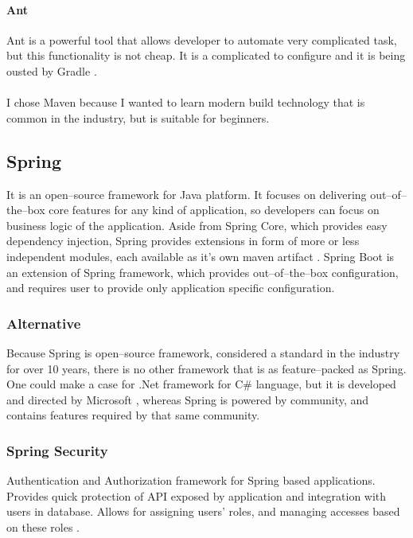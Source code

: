 \documentclass[a4paper,twoside,12pt]{book}
\begin{document}
        \paragraph{Ant}
          Ant is a powerful tool that allows developer to automate very complicated task, but this functionality is not cheap.
          It is a complicated to configure and it is being ousted by Gradle \cite{bib:ant}.

      \paragraph{} %
      I chose Maven because I wanted to learn modern build technology that is common in the industry, but is suitable for beginners.

    \subsection{Spring}
      It is an open--source framework for Java platform. It focuses on delivering out--of--the--box core features for any kind of application, 
      so developers can focus on business logic of the application. 
      Aside from Spring Core, which provides easy dependency injection, Spring provides extensions in form of more or less independent modules, each available as it's own maven artifact \cite{bib:spring}.
      Spring Boot is an extension of Spring framework, which provides out--of--the--box configuration, and requires user to provide only application specific configuration.
      
      \subsubsection{Alternative}
        Because Spring is open--source framework, considered a standard in the industry for over 10 years, there is no other framework that is as feature--packed as Spring.
        One could make a case for .Net framework for C\# language, but it is developed and directed by Microsoft \cite{bib:thai2003net}, 
        whereas Spring is powered by community, and contains features required by that same community. 

      \subsubsection{Spring Security}
        Authentication and Authorization framework for Spring based applications. Provides quick protection of API exposed by application and
        integration with users in database. Allows for assigning users' roles, and managing accesses based on these roles \cite{bib:spring_security}.
\end{document}
